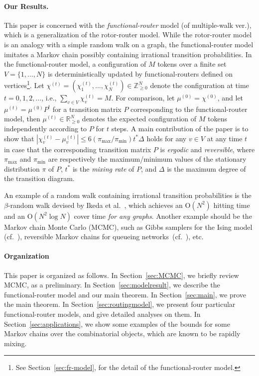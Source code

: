 \documentclass[letter, 11pt]{article}
\newcommand{\Order}{\mathrm{O}}
\newcommand{\1}{\mbox{1}\hspace{-0.25em}\mbox{l}}
\begin{document}
\paragraph{Our Results.}This paper is concerned with the {\em functional-router} model (of multiple-walk ver.), 
   which is a generalization of the rotor-router model. 
 While the rotor-router model is an analogy with a simple random walk on a graph, 
  the functional-router model imitates a Markov chain 
  possibly containing irrational transition probabilities. 
 In the functional-router model, 
  a configuration of $M$ tokens over a finite set $V = \{1, \ldots, N\}$ 
  is deterministically updated by functional-routers defined on vertices\footnote{
    See Section~\ref{sec:fr-model}, for the detail of the functional-router model.}. 
 Let $\chi^{(t)} = (\chi^{(t)}_1, \ldots, \chi^{(t)}_N) \in \mathbb{Z}_{\geq 0}^N$ denote 
   the configuration at time $t = 0, 1, 2, \ldots$, 
   i.e., $\sum_{v \in V} \chi^{(t)}_v = M$. 
 For comparison, 
  let $\mu^{(0)} = \chi^{(0)}$, and 
  let $\mu^{(t)} = \mu^{(0)}P^t$ for a transition matrix $P$ corresponding to the functional-router model, 
 then 
  $\mu^{(t)}\in \mathbb{R}_{\geq 0}^N$ denotes the expected configuration of $M$ tokens 
  independently according to $P$ for $t$ steps. 
 A main contribution of the paper is to show that  
   $|\chi^{(t)}_v - \mu^{(t)}_v| \leq 6 (\pi_{\max}/\pi_{\min}) t^* \Delta$ 
   holds for any $v \in V$ at any time $t$ 
   in case that the corresponding transition matrix $P$ is {\em ergodic} and {\em reversible}, 
  where 
  $\pi_{\max}$ and $\pi_{\min}$ are respectively the maximum/minimum values of the stationary distribution $\pi$ of $P$, 
  $t^*$ is the {\em mixing rate} of $P$, and 
  $\Delta$ is the maximum degree of the transition diagram. 

An example of a random walk containing irrational transition probabilities is 
  the $\beta$-random walk devised by Ikeda et al.~\cite{IKY09}, 
  which achieves an $\Order(N^2)$ hitting time and an $\Order(N^2 \log N)$ cover time {\em for any graphs}. 
 Another example should be the Markov chain Monte Carlo (MCMC), 
   such as Gibbs samplers for the Ising model (cf.\ \cite{Sinclair93, PW96}), 
   reversible Markov chains for queueing networks~(cf.~\cite{KM08}), etc.  


\paragraph{Organization}
 This paper is organized as follows.  
 In Section~\ref{sec:MCMC}, 
   we briefly review MCMC, 
    as a preliminary. 
 In Section~\ref{sec:modelresult}, 
  we describe the functional-router model and our main theorem.   
 In Section~\ref{sec:main}, 
   we prove the main theorem. In Section~\ref{sec:routingmodel}, 
   we present four particular functional-router models, and give detailed analyses on them. 
 In Section~\ref{sec:applications}, 
   we show some examples of the bounds 
    for some Markov chains over the combinatorial objects, 
   which are known to be rapidly mixing. 
\end{document}
